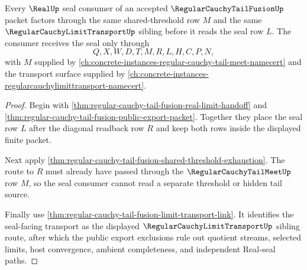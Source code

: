 \begin{theorem}
\label{thm:regular-cauchy-tail-fusion-real-seal-factorization}
Every $\RealUp$ seal consumer of an accepted $\RegularCauchyTailFusionUp$ packet factors through the same shared-threshold row $M$ and the same $\RegularCauchyLimitTransportUp$ sibling before it reads the seal row $L$. The consumer receives the seal only through
$$
Q,X,W,D,T,M,R,L,H,C,P,N,
$$
with $M$ supplied by \autoref{ch:concrete-instances-regular-cauchy-tail-meet-namecert} and the transport surface supplied by \autoref{ch:concrete-instances-regularcauchylimittransport-namecert}.
\end{theorem}
\begin{proof}
Begin with \autoref{thm:regular-cauchy-tail-fusion-real-limit-handoff} and \autoref{thm:regular-cauchy-tail-fusion-public-export-packet}. Together they place the seal row $L$ after the diagonal readback row $R$ and keep both rows inside the displayed finite packet.

Next apply \autoref{thm:regular-cauchy-tail-fusion-shared-threshold-exhaustion}. The route to $R$ must already have passed through the $\RegularCauchyTailMeetUp$ row $M$, so the seal consumer cannot read a separate threshold or hidden tail source.

Finally use \autoref{thm:regular-cauchy-tail-fusion-limit-transport-link}. It identifies the seal-facing transport as the displayed $\RegularCauchyLimitTransportUp$ sibling route, after which the public export exclusions rule out quotient streams, selected limits, host convergence, ambient completeness, and independent Real-seal paths.
\end{proof}

